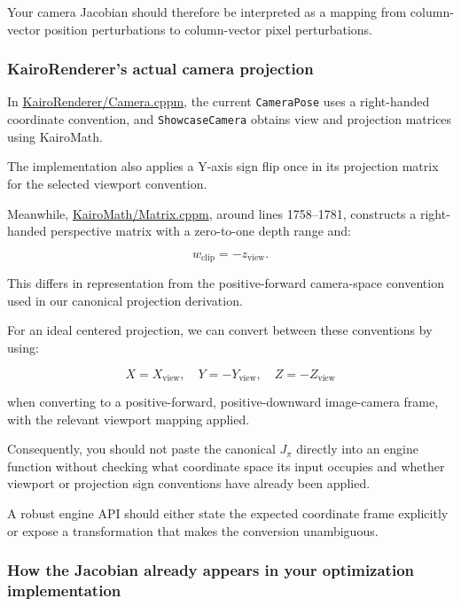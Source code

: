 Your camera Jacobian should therefore be interpreted as a mapping from column-vector position perturbations to column-vector pixel perturbations.

\subsubsection{KairoRenderer's actual camera projection}\label{02-foundations-ii-ch021-kairorenderers-actual-camera-projection}

In \href{https://github.com/swayam8624/KairoRenderer/blob/main/Camera.cppm?utm_source=chatgpt.com}{KairoRenderer/Camera.cppm}, the current \texttt{CameraPose} uses a right-handed coordinate convention, and \texttt{ShowcaseCamera} obtains view and projection matrices using KairoMath.

The implementation also applies a Y-axis sign flip once in its projection matrix for the selected viewport convention.

Meanwhile, \href{https://github.com/swayam8624/KairoMath/blob/master/Matrix.cppm?utm_source=chatgpt.com}{KairoMath/Matrix.cppm}, around lines 1758--1781, constructs a right-handed perspective matrix with a zero-to-one depth range and:

\[
w_{\text{clip}}=-z_{\text{view}}.
\]

This differs in representation from the positive-forward camera-space convention used in our canonical projection derivation.

For an ideal centered projection, we can convert between these conventions by using:

\[
X=X_{\text{view}},\quad Y=-Y_{\text{view}},\quad Z=-Z_{\text{view}}
\]

when converting to a positive-forward, positive-downward image-camera frame, with the relevant viewport mapping applied.

Consequently, you should not paste the canonical \(J_\pi\) directly into an engine function without checking what coordinate space its input occupies and whether viewport or projection sign conventions have already been applied.

A robust engine API should either state the expected coordinate frame explicitly or expose a transformation that makes the conversion unambiguous.

\subsubsection{How the Jacobian already appears in your optimization implementation}\label{02-foundations-ii-ch021-how-the-jacobian-already-appears-in-your-optimization-implementation}


